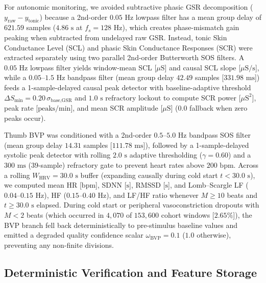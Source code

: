 \documentclass[a4paper,fleqn]{cas-dc}
\begin{document}
For autonomic monitoring, we avoided subtractive phasic GSR decomposition ($y_{\text{raw}} - y_{\text{tonic}}$) because a 2nd-order $0.05\text{ Hz}$ lowpass filter has a mean group delay of $621.59$ samples ($4.86\text{ s}$ at $f_s = 128\text{ Hz}$), which creates phase-mismatch gain peaking when subtracted from undelayed raw GSR. Instead, tonic Skin Conductance Level (SCL) and phasic Skin Conductance Responses (SCR) were extracted separately using two parallel 2nd-order Butterworth SOS filters. A $0.05\text{ Hz}$ lowpass filter yields window-mean SCL [$\mu\text{S}$] and causal SCL slope [$\mu\text{S}/\text{s}$], while a $0.05\text{--}1.5\text{ Hz}$ bandpass filter (mean group delay $42.49$ samples [$331.98\text{ ms}$]) feeds a 1-sample-delayed causal peak detector with baseline-adaptive threshold $\Delta S_{\min} = 0.20\,\sigma_{\text{base,GSR}}$ and $1.0\text{ s}$ refractory lockout to compute SCR power [$\mu\text{S}^2$], peak rate [$\text{peaks/min}$], and mean SCR amplitude [$\mu\text{S}$] ($0.0$ fallback when zero peaks occur).

Thumb BVP was conditioned with a 2nd-order $0.5\text{--}5.0\text{ Hz}$ bandpass SOS filter (mean group delay $14.31$ samples [$111.78\text{ ms}$]), followed by a 1-sample-delayed systolic peak detector with rolling $2.0\text{ s}$ adaptive thresholding ($\gamma = 0.60$) and a $300\text{ ms}$ ($39$-sample) refractory gate to prevent heart rates above $200\text{ bpm}$. Across a rolling $W_{\text{HRV}} = 30.0\text{ s}$ buffer (expanding causally during cold start $t < 30.0\text{ s}$), we computed mean HR [$\text{bpm}$], SDNN [$\text{s}$], RMSSD [$\text{s}$], and Lomb--Scargle LF ($0.04\text{--}0.15\text{ Hz}$), HF ($0.15\text{--}0.40\text{ Hz}$), and LF/HF ratio whenever $M \ge 10$ beats and $t \ge 30.0\text{ s}$ elapsed. During cold start or peripheral vasoconstriction dropouts with $M < 2$ beats (which occurred in $4,070$ of $153,600$ cohort windows [$2.65\%$]), the BVP branch fell back deterministically to pre-stimulus baseline values and emitted a degraded quality confidence scalar $\omega_{\text{BVP}} = 0.1$ ($1.0$ otherwise), preventing any non-finite divisions.

\subsection{Deterministic Verification and Feature Storage}\label{subsec:phase1_verification}
\end{document}
